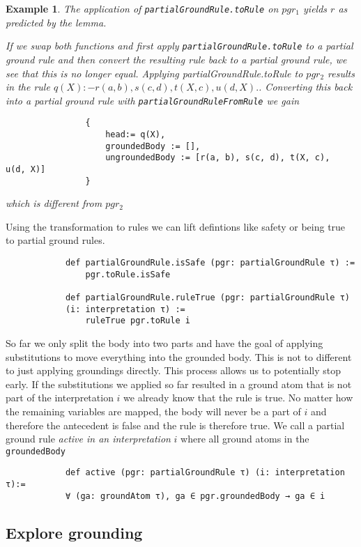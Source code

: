 \documentclass{article}
\newtheorem{example}{Example}
\begin{document}
        \begin{example}
            The application of \texttt{partialGroundRule.toRule} on $pgr_1$ yields $r$ as predicted by the lemma.

            If we swap both functions and first apply \texttt{partialGroundRule.toRule} to a partial ground rule and then convert the resulting rule back to a partial ground rule, we see that this is no longer equal. Applying {partialGroundRule.toRule} to $pgr_2$ results in the rule $ q(X) :- r(a, b), s(c, d), t(X, c),  u(d, X) . $. Converting this back into a partial ground rule with \texttt{partialGroundRuleFromRule} we gain 

            \begin{lstlisting}
                {
                    head:= q(X),
                    groundedBody := [],
                    ungroundedBody := [r(a, b), s(c, d), t(X, c),  u(d, X)]
                }
            \end{lstlisting}
            which is different from $pgr_2$
        \end{example}

        Using the transformation to rules we can lift defintions like safety or being true to partial ground rules.

        \begin{lstlisting}
            def partialGroundRule.isSafe (pgr: partialGroundRule τ) :=
                pgr.toRule.isSafe

            def partialGroundRule.ruleTrue (pgr: partialGroundRule τ) 
            (i: interpretation τ) :=
                ruleTrue pgr.toRule i
        \end{lstlisting}

        So far we only split the body into two parts and have the goal of applying substitutions to move everything into the grounded body. This is not to different to just applying groundings directly. 
        This process allows us to potentially stop early. If the substitutions we applied so far resulted in a ground atom that is not part of the interpretation $i$ we already know that the rule is true. No matter how the remaining variables are mapped, the body will never be a part of $i$ and therefore the antecedent is false and the rule is therefore true. We call a partial ground rule \textit{active in an interpretation} $i$ where all ground atoms in the \texttt{groundedBody} 

        \begin{lstlisting}
            def active (pgr: partialGroundRule τ) (i: interpretation τ):=
            ∀ (ga: groundAtom τ), ga ∈ pgr.groundedBody → ga ∈ i 
        \end{lstlisting}

    \subsection{Explore grounding}
\end{document}
